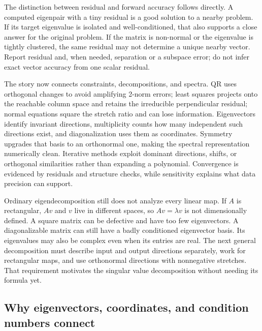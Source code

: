 The distinction between residual and forward accuracy follows directly. A computed eigenpair with a tiny residual is a good solution to a nearby problem. If its target eigenvalue is isolated and well-conditioned, that also supports a close answer for the original problem. If the matrix is non-normal or the eigenvalue is tightly clustered, the same residual may not determine a unique nearby vector. Report residual and, when needed, separation or a subspace error; do not infer exact vector accuracy from one scalar residual.

The story now connects constraints, decompositions, and spectra. QR uses orthogonal changes to avoid amplifying 2-norm errors; least squares projects onto the reachable column space and retains the irreducible perpendicular residual; normal equations square the stretch ratio and can lose information. Eigenvectors identify invariant directions, multiplicity counts how many independent such directions exist, and diagonalization uses them as coordinates. Symmetry upgrades that basis to an orthonormal one, making the spectral representation numerically clean. Iterative methods exploit dominant directions, shifts, or orthogonal similarities rather than expanding a polynomial. Convergence is evidenced by residuals and structure checks, while sensitivity explains what data precision can support.

Ordinary eigendecomposition still does not analyze every linear map. If \(A\) is rectangular, \(Av\) and \(v\) live in different spaces, so \(Av=\lambda v\) is not dimensionally defined. A square matrix can be defective and have too few eigenvectors. A diagonalizable matrix can still have a badly conditioned eigenvector basis. Its eigenvalues may also be complex even when its entries are real. The next general decomposition must describe input and output directions separately, work for rectangular maps, and use orthonormal directions with nonnegative stretches. That requirement motivates the singular value decomposition without needing its formula yet.

\subsection{Why eigenvectors, coordinates, and condition numbers connect}\label{01-foundations-i-ch020-why-eigenvectors-coordinates-and-condition-numbers-connect}

\hypertarget{01-foundations-i-ch020-why-eigenvectors-coordinates-and-condition-numbers-connect}{}

